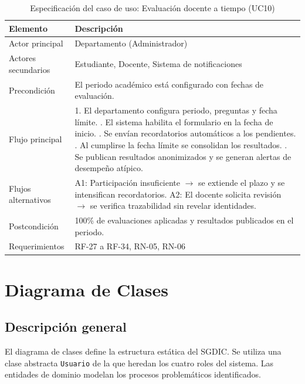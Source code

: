 \begin{table}[H]
\centering
\caption{Especificación del caso de uso: Evaluación docente a tiempo (UC10)}
\label{tab:uc10}
\small
\begin{tabularx}{\textwidth}{@{}l X@{}}
\toprule
\rowcolor{verdeClaro}
\textbf{Elemento} & \textbf{Descripción} \\
\midrule
Actor principal & Departamento (Administrador) \\
Actores secundarios & Estudiante, Docente, Sistema de notificaciones \\
Precondición & El periodo académico está configurado con fechas de evaluación. \\
Flujo principal &
  1. El departamento configura periodo, preguntas y fecha límite. \newline
  2. El sistema habilita el formulario en la fecha de inicio. \newline
  3. Se envían recordatorios automáticos a los pendientes. \newline
  4. Al cumplirse la fecha límite se consolidan los resultados. \newline
  5. Se publican resultados anonimizados y se generan alertas de desempeño atípico. \\
Flujos alternativos &
  A1: Participación insuficiente $\to$ se extiende el plazo y se intensifican recordatorios. \newline
  A2: El docente solicita revisión $\to$ se verifica trazabilidad sin revelar identidades. \\
Postcondición & 100\% de evaluaciones aplicadas y resultados publicados en el periodo. \\
Requerimientos & RF-27 a RF-34, RN-05, RN-06 \\
\bottomrule
\end{tabularx}
\end{table}

\section{Diagrama de Clases}

\subsection{Descripción general}
El diagrama de clases define la estructura estática del \ac{SGDIC}. Se utiliza una
clase abstracta \texttt{Usuario} de la que heredan los cuatro roles del sistema.
Las entidades de dominio modelan los procesos problemáticos identificados.

